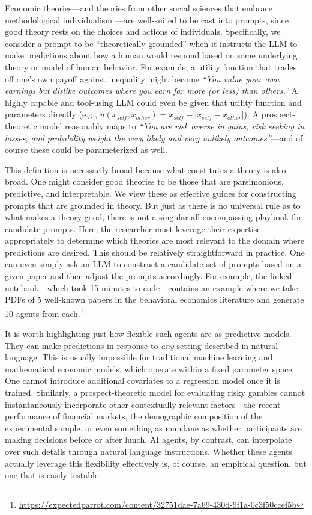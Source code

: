 \documentclass[11pt]{article}
\theoremstyle{definition}
\newcommand{\aisub}{AI agent}
\newcommand{\persona}{prompt}
\begin{document}
Economic theories---and theories from other social sciences that embrace methodological individualism \citep{friedman1953methodology}---are well-suited to be cast into \persona{s}, since good theory rests on the choices and actions of individuals.
Specifically, we consider a prompt to be ``theoretically grounded'' when it instructs the LLM to make predictions about how a human would respond based on some underlying theory or model of human behavior.
For example, a utility function that trades off one's own payoff against inequality might become \emph{``You value your own earnings but dislike outcomes where you earn far more (or less) than others.''}
A highly capable and tool-using LLM could even be given that utility function and parameters directly (e.g., $u(x_{self}, x_{other})= x_{self} - | x_{self} - x_{other}|$).
A prospect-theoretic model reasonably maps to \emph{``You are risk averse in gains, risk seeking in losses, and probability weight the very likely and very unlikely outcomes''}---and of course these could be parameterized as well.

This definition is necessarily broad because what constitutes a theory is also broad.
One might consider good theories to be those that are parsimonious, predictive, and interpretable.
We view these as effective guides for constructing \persona{s} that are grounded in theory.
But just as there is no universal rule as to what makes a theory good, there is not a singular all-encompassing playbook for candidate \persona{s}.
Here, the researcher must leverage their expertise appropriately to determine which theories are most relevant to the domain where predictions are desired.
This should be relatively straightforward in practice.
One can even simply ask an LLM to construct a candidate set of prompts based on a given paper and then adjust the prompts accordingly.
For example, the linked notebook---which took 15 minutes to code---contains an example where we take PDFs of 5 well-known papers in the behavioral economics literature and generate 10 agents from each.\footnote{\url{https://expectedparrot.com/content/32751dae-7a69-430d-9f1a-0c3f50ccef5b}}

It is worth highlighting just how flexible such agents are as predictive models.
They can make predictions in response to \emph{any} setting described in natural language.
This is usually impossible for traditional machine learning and mathematical economic models, which operate within a fixed parameter space. 
One cannot introduce additional covariates to a regression model once it is trained. 
Similarly, a prospect-theoretic model for evaluating risky gambles cannot instantaneously incorporate other contextually relevant factors---the recent performance of financial markets, the demographic composition of the experimental sample, or even something as mundane as whether participants are making decisions before or after lunch. 
\aisub{s}, by contrast, can interpolate over such details through natural language instructions. 
Whether these agents actually leverage this flexibility effectively is, of course, an empirical question, but one that is easily testable.
\end{document}

